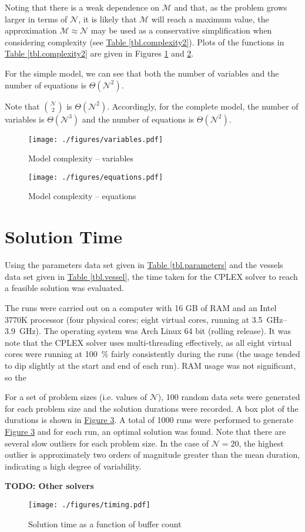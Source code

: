 Noting that there is a weak dependence on $\mathcal{M}$ and that, as the problem
grows larger in terms of $\mathcal{N}$, it is likely that $\mathcal{M}$ will
reach a maximum value, the approximation $\mathcal{M} \approx \mathcal{N}$ may
be used as a conservative simplification when considering complexity (see
\hyperref[tbl.complexity2]{Table \ref*{tbl.complexity2}}).
Plots of the functions in
\hyperref[tbl.complexity2]{Table \ref*{tbl.complexity2}} are given in
Figures \ref{fig.dims} and \ref{fig.eqns}.


For the simple model, we can see that both the number of variables and the
number of equations is $\Theta \left( \mathcal{N}^2 \right)$.

Note that ${{\mathcal{N}}\choose{2}}$ is $\Theta \left( \mathcal{N}^2 \right)$.
Accordingly, for the complete model, the number of variables is 
$\Theta \left( \mathcal{N}^3 \right)$ and the number of equations is
$\Theta \left( \mathcal{N}^2 \right)$.

\begin{figure}
    \centering
    \texttt{[image: ./figures/variables.pdf]}
    \caption{Model complexity -- variables}
    \label{fig.dims}
\end{figure}
\begin{figure}
    \centering
    \texttt{[image: ./figures/equations.pdf]}
    \caption{Model complexity -- equations}
    \label{fig.eqns}
\end{figure}

\section{Solution Time}\label{S.soltime}
Using the parameters data set given in 
\hyperref[tbl.parameters]{Table \ref*{tbl.parameters}} and the vessels data set
given in \hyperref[tbl.vessel]{Table \ref*{tbl.vessel}}, the time taken for
the CPLEX solver to reach a feasible solution was evaluated.

The runs were carried out on a computer with 16 GB of RAM and an Intel 3770K
processor (four physical cores; eight virtual cores, running at
 \SIrange{3.5}{3.9}{\GHz}).
The operating system was Arch Linux 64 bit (rolling release).
It was note that the CPLEX solver uses multi-threading effectively, as all eight
virtual cores were running at \SI{100}{\%} fairly consistently during the runs
(the usage tended to dip slightly at the start and end of each run).
RAM usage was not significant, so the 

For a set of problem sizes (i.e. values of $\mathcal{N}$), 100 random data sets
were generated for each problem size and the solution durations were recorded.
A box plot of the durations is shown in 
\hyperref[fig.timing]{Figure \ref*{fig.timing}}.
A total of \num{1000} runs were performed to generate
\hyperref[fig.timing]{Figure \ref*{fig.timing}} and for each run, an optimal
solution was found.
Note that there are several slow outliers for each problem size.
In the case of $\mathcal{N}=20$, the highest outlier is approximately two
orders of magnitude greater than the mean duration, indicating a high degree
of variability.

\textbf{TODO: Other solvers}

\begin{figure}
    \label{fig.timing}
    \centering
    \texttt{[image: ./figures/timing.pdf]}
    \caption{Solution time as a function of buffer count}
\end{figure}

